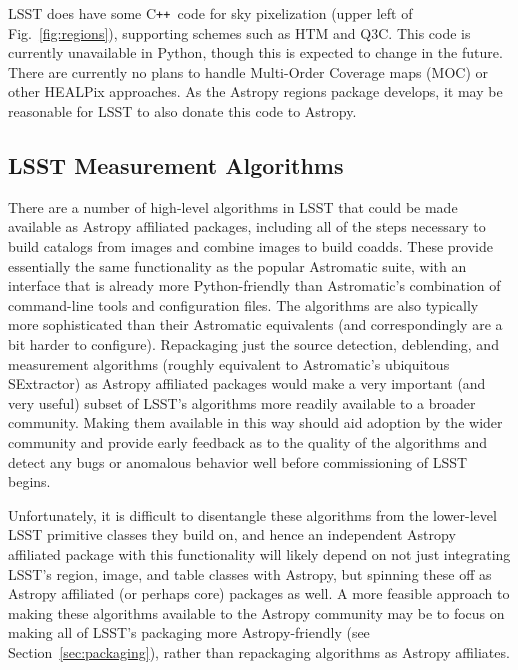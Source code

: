 \documentclass[]{spie}  %
\newcommand{\CPP}{C\texttt{++}\xspace}  %
\begin{document}
LSST does have some \CPP\ code for sky pixelization (upper left of Fig.~\ref{fig:regions}), supporting schemes such as HTM\cite{2001misk.conf..631K} and Q3C\cite{2006ASPC..351..735K}.
This code is currently unavailable in Python, though this is expected to change in the future.
There are currently no plans to handle Multi-Order Coverage maps (MOC)\cite{2012ASPC..461..347F,2014ivoa.spec.0602F} or other HEALPix approaches\cite{2015A&A...580A.132R}.
As the Astropy regions package develops, it may be reasonable for LSST to also donate this code to Astropy.

\subsection{LSST Measurement Algorithms}

There are a number of high-level algorithms in LSST that could be made available as Astropy affiliated packages\cite{bosch_2016_48435}, including all of the steps necessary to build catalogs from images and combine images to build coadds.
These provide essentially the same functionality as the popular Astromatic suite\cite{2012ASSP...29...71B}, with an interface that is already more Python-friendly than Astromatic's combination of command-line tools and configuration files.
The algorithms are also typically more sophisticated than their Astromatic equivalents (and correspondingly are a bit harder to configure).
Repackaging just the source detection, deblending, and measurement algorithms (roughly equivalent to Astromatic's ubiquitous SExtractor) as Astropy affiliated packages would make a very important (and very useful) subset of LSST's algorithms more readily available to a broader community.
Making them available in this way should aid adoption by the wider community and provide early feedback as to the quality of the algorithms and detect any bugs or anomalous behavior well before commissioning of LSST begins.

Unfortunately, it is difficult to disentangle these algorithms from the lower-level LSST primitive classes they build on, and hence an independent Astropy affiliated package with this functionality will likely depend on not just integrating LSST's region, image, and table classes with Astropy, but spinning these off as Astropy affiliated (or perhaps core) packages as well.
A more feasible approach to making these algorithms available to the Astropy community may be to focus on making all of LSST's packaging more Astropy-friendly (see Section~\ref{sec:packaging}), rather than repackaging algorithms as Astropy affiliates.
\end{document}
